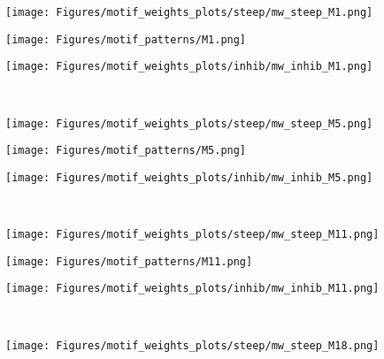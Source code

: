 \documentclass[smallextended]{svjour3}       %
\theoremstyle{definition}
\begin{document}
\begin{figure}[]
	\centering
	\hfill
	\begin{minipage}{0.30\textwidth}%
		\texttt{[image: Figures/motif\_weights\_plots/steep/mw\_steep\_M1.png]}
	\end{minipage}
	\hfill
	\begin{minipage}{0\textwidth}%
		\texttt{[image: Figures/motif\_patterns/M1.png]}	
	\end{minipage}
	\hfill
	\begin{minipage}{0.35\textwidth}
		\texttt{[image: Figures/motif\_weights\_plots/inhib/mw\_inhib\_M1.png]}
	\end{minipage}
	
	\hfill
	\\
	\hfill
	\begin{minipage}{0.30\textwidth}%
		\texttt{[image: Figures/motif\_weights\_plots/steep/mw\_steep\_M5.png]}
	\end{minipage}
	\hfill
	\begin{minipage}{0\textwidth}%
		\texttt{[image: Figures/motif\_patterns/M5.png]}	
	\end{minipage}
	\hfill
	\begin{minipage}{0.35\textwidth}
		\texttt{[image: Figures/motif\_weights\_plots/inhib/mw\_inhib\_M5.png]}
	\end{minipage}
	\hfill
	\\
	\hfill
	\begin{minipage}{0.30\textwidth}%
		\texttt{[image: Figures/motif\_weights\_plots/steep/mw\_steep\_M11.png]}
	\end{minipage}
	\hfill
	\begin{minipage}{0\textwidth}%
		\texttt{[image: Figures/motif\_patterns/M11.png]}	
	\end{minipage}
	\hfill
	\begin{minipage}{0.35\textwidth}
		\texttt{[image: Figures/motif\_weights\_plots/inhib/mw\_inhib\_M11.png]}
	\end{minipage}
	\hfill
	\\
	\hfill
	\begin{minipage}{0.30\textwidth}%
		\texttt{[image: Figures/motif\_weights\_plots/steep/mw\_steep\_M18.png]}

\end{minipage}
\end{figure}
\end{document}
